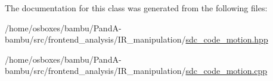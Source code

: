 The documentation for this class was generated from the following files\+:\begin{DoxyCompactItemize}
\item 
/home/osboxes/bambu/\+Pand\+A-\/bambu/src/frontend\+\_\+analysis/\+I\+R\+\_\+manipulation/\hyperlink{sdc__code__motion_8hpp}{sdc\+\_\+code\+\_\+motion.\+hpp}\item 
/home/osboxes/bambu/\+Pand\+A-\/bambu/src/frontend\+\_\+analysis/\+I\+R\+\_\+manipulation/\hyperlink{sdc__code__motion_8cpp}{sdc\+\_\+code\+\_\+motion.\+cpp}\end{DoxyCompactItemize}
